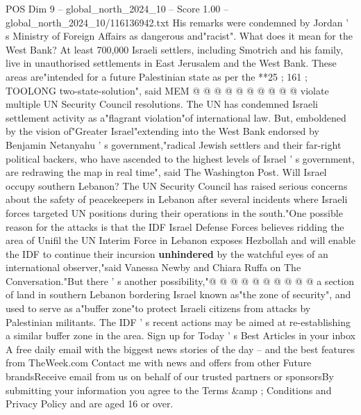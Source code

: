 \begin{textsample}{POS Dim 9 – global\_north\_2024\_10 – Score 1.00 – global\_north\_2024\_10/116136942.txt}
His remarks were condemned by Jordan ' s Ministry of Foreign Affairs as dangerous and"racist".
What does it mean for the West Bank?
At least 700,000 Israeli settlers, including Smotrich and his family, live in unauthorised settlements in East Jerusalem and the West Bank.
These areas are"intended for a future Palestinian state as per the **25 ; 161 ; TOOLONG two-state-solution", said MEM @ @ @ @ @ @ @ @ @ @ violate multiple UN Security Council resolutions.
The UN has condemned Israeli settlement activity as a"flagrant violation"of international law.
But, emboldened by the vision of"Greater Israel"extending into the West Bank endorsed by Benjamin Netanyahu ' s government,"radical Jewish settlers and their far-right political backers, who have ascended to the highest levels of Israel ' s government, are redrawing the map in real time", said The Washington Post.
Will Israel occupy southern Lebanon?
The UN Security Council has raised serious concerns about the safety of peacekeepers in Lebanon after several incidents where Israeli forces targeted UN positions during their operations in the south."One possible reason for the attacks is that the IDF Israel Defense Forces believes ridding the area of Unifil the UN Interim Force in Lebanon exposes Hezbollah and will enable the IDF to continue their incursion \textbf{unhindered} by the watchful eyes of an international observer,"said Vanessa Newby and Chiara Ruffa on The Conversation."But there ' s another possibility,"@ @ @ @ @ @ @ @ @ @ a section of land in southern Lebanon bordering Israel known as"the zone of security", and used to serve as a"buffer zone"to protect Israeli citizens from attacks by Palestinian militants.
The IDF ' s recent actions may be aimed at re-establishing a similar buffer zone in the area.
Sign up for Today ' s Best Articles in your inbox A free daily email with the biggest news stories of the day -- and the best features from TheWeek.com Contact me with news and offers from other Future brandsReceive email from us on behalf of our trusted partners or sponsorsBy submitting your information you agree to the Terms \&amp ; Conditions and Privacy Policy and are aged 16 or over.

\end{textsample}
